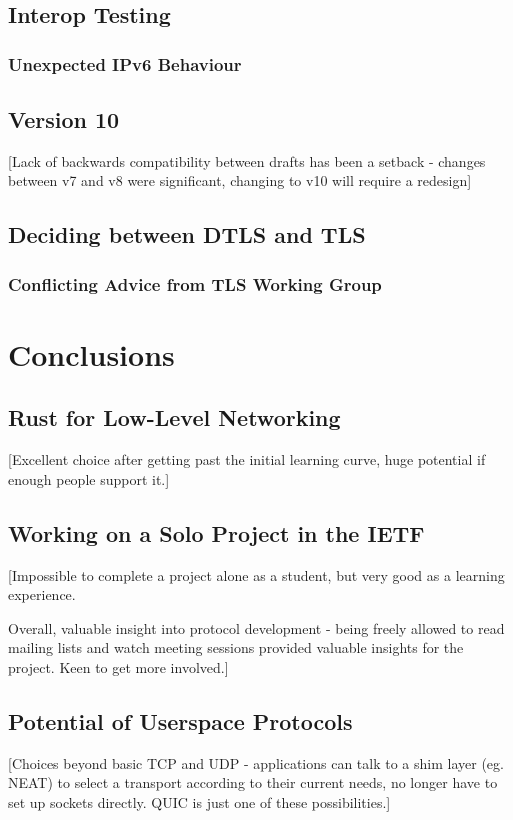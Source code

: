 \documentclass{l4proj}
\begin{document}
\section{Interop Testing}
\subsection{Unexpected IPv6 Behaviour}

\section{Version 10}
[Lack of backwards compatibility between drafts has been a setback - changes between v7 and v8 were significant, changing to v10 will require a redesign]

\section{Deciding between DTLS and TLS}

\subsection{Conflicting Advice from TLS Working Group}


\pagebreak


\chapter{Conclusions}
\section{Rust for Low-Level Networking}
[Excellent choice after getting past the initial learning curve, huge potential if enough people support it.]

\section{Working on a Solo Project in the IETF}
[Impossible to complete a project alone as a student, but very good as a learning experience.

Overall, valuable insight into protocol development - being freely allowed to read mailing lists and watch meeting sessions provided valuable insights for the project. Keen to get more involved.]

\section{Potential of Userspace Protocols}
[Choices beyond basic TCP and UDP - applications can talk to a shim layer (eg. NEAT) to select a transport according to their current needs, no longer have to set up sockets directly. QUIC is just one of these possibilities.]
\end{document}
